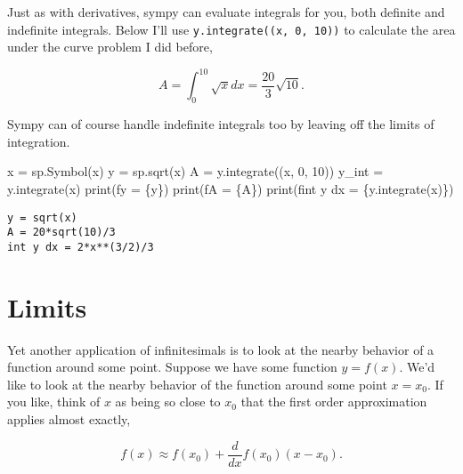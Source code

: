 \documentclass[
  letterpaper,
  DIV=11,
  numbers=noendperiod]{scrreprt}
\newenvironment{Shaded}{\begin{snugshade}}{\end{snugshade}}
\newcommand{\BuiltInTok}[1]{\textcolor[rgb]{0.00,0.23,0.31}{#1}}
\newcommand{\DecValTok}[1]{\textcolor[rgb]{0.68,0.00,0.00}{#1}}
\newcommand{\NormalTok}[1]{\textcolor[rgb]{0.00,0.23,0.31}{#1}}
\newcommand{\OperatorTok}[1]{\textcolor[rgb]{0.37,0.37,0.37}{#1}}
\newcommand{\SpecialCharTok}[1]{\textcolor[rgb]{0.37,0.37,0.37}{#1}}
\newcommand{\SpecialStringTok}[1]{\textcolor[rgb]{0.13,0.47,0.30}{#1}}
\newcommand{\StringTok}[1]{\textcolor[rgb]{0.13,0.47,0.30}{#1}}
\begin{document}
Just as with derivatives, sympy can evaluate integrals for you, both
definite and indefinite integrals. Below I'll use
\texttt{y.integrate((x,\ 0,\ 10))} to calculate the area under the curve
problem I did before,

\[A = \int_0^{10} \sqrt{x} dx = \frac{20}{3} \sqrt{10}.\]

Sympy can of course handle indefinite integrals too by leaving off the
limits of integration.

\begin{Shaded}
\begin{Highlighting}[]
\NormalTok{x }\OperatorTok{=}\NormalTok{ sp.Symbol(}\StringTok{\textquotesingle{}x\textquotesingle{}}\NormalTok{)}
\NormalTok{y }\OperatorTok{=}\NormalTok{ sp.sqrt(x)}
\NormalTok{A }\OperatorTok{=}\NormalTok{ y.integrate((x, }\DecValTok{0}\NormalTok{, }\DecValTok{10}\NormalTok{))}
\NormalTok{y\_int }\OperatorTok{=}\NormalTok{ y.integrate(x)}
\BuiltInTok{print}\NormalTok{(}\SpecialStringTok{f\textquotesingle{}y = }\SpecialCharTok{\{}\NormalTok{y}\SpecialCharTok{\}}\SpecialStringTok{\textquotesingle{}}\NormalTok{)}
\BuiltInTok{print}\NormalTok{(}\SpecialStringTok{f\textquotesingle{}A = }\SpecialCharTok{\{}\NormalTok{A}\SpecialCharTok{\}}\SpecialStringTok{\textquotesingle{}}\NormalTok{)}
\BuiltInTok{print}\NormalTok{(}\SpecialStringTok{f\textquotesingle{}int y dx = }\SpecialCharTok{\{}\NormalTok{y}\SpecialCharTok{.}\NormalTok{integrate(x)}\SpecialCharTok{\}}\SpecialStringTok{\textquotesingle{}}\NormalTok{)}
\end{Highlighting}
\end{Shaded}

\begin{verbatim}
y = sqrt(x)
A = 20*sqrt(10)/3
int y dx = 2*x**(3/2)/3
\end{verbatim}

\hypertarget{limits}{%
\section{Limits}\label{limits}}

Yet another application of infinitesimals is to look at the nearby
behavior of a function around some point. Suppose we have some function
\(y=f(x)\). We'd like to look at the nearby behavior of the function
around some point \(x=x_0\). If you like, think of \(x\) as being so
close to \(x_0\) that the first order approximation applies almost
exactly,

\[f(x) \approx f(x_0) + \frac{d}{dx}f(x_0) (x-x_0).\]
\end{document}
